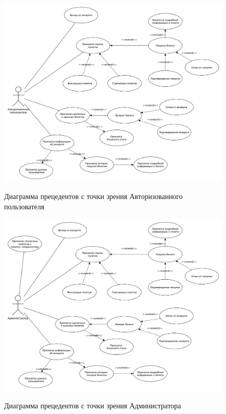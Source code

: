 \begin{figure}[H]
	\begin{center}
		{\includegraphics[scale = 0.4]{../img/use-case/auth-user.pdf}}
		\caption{Диаграмма прецедентов с точки зрения Авторизованного пользователя}
		\label{fig:use-case-auth}
	\end{center}
\end{figure}

\begin{figure}[H]
	\begin{center}
		{\includegraphics[scale = 0.45]{../img/use-case/admin.pdf}}
		\caption{Диаграмма прецедентов с точки зрения Администратора}
		\label{fig:use-case-admin}
	\end{center}
\end{figure}
